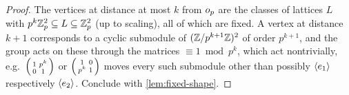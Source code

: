 \begin{proof}
The vertices at distance at most $k$ from $o_{p}$ are the
classes of lattices $L$ with $p^{k}\mathbb{Z}_{p}^{2} \subseteq L
\subseteq \mathbb{Z}_{p}^{2}$ (up to scaling), all of which are
fixed. A vertex at distance $k+1$ corresponds to a cyclic submodule of
$(\mathbb{Z}/p^{k+1}\mathbb{Z})^{2}$ of order $p^{k+1}$, and the group
acts on these through the matrices $\equiv 1 \bmod p^{k}$, which act
nontrivially, e.g.\ $\left(\begin{smallmatrix} 1 & p^{k} \\ 0 & 1 \end{smallmatrix}\right)$ or $\left(\begin{smallmatrix} 1 & 0 \\ p^{k} & 1 \end{smallmatrix}\right)$
moves every such submodule other than possibly $\langle e_{1}\rangle$
respectively $\langle e_{2}\rangle$. Conclude with
\cref{lem:fixed-shape}.
\end{proof}

